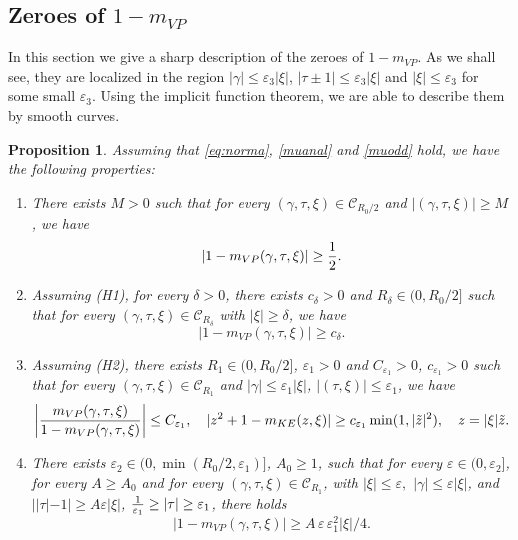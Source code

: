 \documentclass[11pt]{amsart}
\numberwithin{equation}{section}
\newtheorem{prop}{Proposition}[section]
\newcommand{\eps}{\varepsilon}
\begin{document}
\subsection{Zeroes of $1-m_{VP}$}

In this section we give a sharp description of the zeroes of $1-m_{VP}$.
As we shall see, they are localized in the region $|\gamma | \leq \eps_{3} | \xi|$, $ | \tau \pm 1| \leq \eps_3|\xi| $ and $|\xi | \leq \eps_{3}$ for some small $\eps_3$. Using the implicit function theorem, we are able to describe them by smooth curves. 

\begin{prop}
\label{lem-zeroes}
 Assuming that  \eqref{eq:norma}, \eqref{muanal} and \eqref{muodd} hold, we have the following properties:
 \begin{enumerate}
 \item[i)] There exists $M>0$ such that for every $(\gamma, \tau, \xi) \in \mathcal{C}_{R_{0}/2}$
  and $|(\gamma, \tau, \xi)| \geq M$, we have
  $$ |1-m_{VP}(\gamma, \tau, \xi) |\geq { 1 \over 2}.$$
  \item[ii)] Assuming  (H1), for every $\delta >0$, there exists $c_{\delta}>0$ and $R_{\delta}\in (0, R_{0}/2]$ such that
   for every $(\gamma, \tau, \xi) \in \mathcal{C}_{R_\delta}$ with $| \xi | \geq \delta$, we have 
  $$|1 - m_{VP}(\gamma, \tau, \xi)| \geq  c_{\delta}.$$
 \item[iii)] Assuming  (H2), there exists $R_{1} \in (0, R_{0}/2]$,  $\eps_{1}>0$  and $C_{\eps_{1}}>0$, $c_{\eps_{1}}>0$  such that for every 
 $(\gamma, \tau, \xi) \in \mathcal{C}_{R_{1}}$ and   $|\gamma| \leq  \eps_{1} |\xi|$, $ |(\tau, \xi)| \leq \eps_{1}$, we have
 \begin{equation}
 \label{penrosepetit}\left|  { m_{VP}(\gamma, \tau, \xi) \over 1 - m_{VP}(\gamma, \tau, \xi)} \right|  \leq  C_{\eps_{1}}, 
  \quad  |z^2 + 1 - m_{KE}(z, \xi) |  \geq c_{\eps_{1}} \min(1, |\tilde z|^2), \quad z= |\xi| \tilde z.
  \end{equation}
\item[iv)] There exists $\eps_{2}\in (0,  \min(R_{0}/2, \eps_{1})]$, $A_{0}\geq 1$,  such that for every
 $ \eps \in (0, \eps_{2}]$, for every $A \geq A_{0}$ and  for every  $(\gamma, \tau, \xi) \in \mathcal{C}_{R_1}$, with $| \xi| \leq \eps, $
 $ | \gamma | \leq  \eps | \xi| $,  and  $  | |\tau|  -   1 | \geq  A \eps | \xi|$,  ${1 \over \eps_{1}} \geq |\tau| \geq \eps_{1}$,
 there holds
 \begin{equation}
 \label{belowmiddle}|1 - m_{VP}(\gamma, \tau, \xi) | \geq  A\,  \eps\, \eps_{1}^2 | \xi|/4.

\end{equation}
\end{enumerate}
\end{prop}
\end{document}

